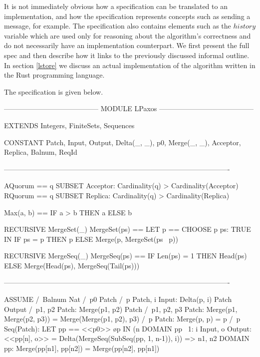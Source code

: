 \documentclass[12pt,a4paper,en]{pracamgr}
\begin{document}
It is not immediately obvious how a specification can be translated to an implementation, and how the specification represents concepts such as sending a message, for example. The specification also contains elements such as the $history$ variable which are used only for reasoning about the algorithm's correctness and do not necessarily have an implementation counterpart. We first present the full spec and then describe how it links to the previously discussed informal outline. In section \ref{lstore} we discuss an actual implementation of the algorithm written in the Rust programming language.

The specification is given below.

\begin{tla}
----------------------------------------- MODULE LPaxos -----------------------------------------

EXTENDS Integers, FiniteSets, Sequences

CONSTANT
    Patch, Input, Output, Delta(_, _), p0, Merge(_, _),
    Acceptor, Replica,
    Balnum,
    ReqId

-------------------------------------------------------------------------------------------------

AQuorum == {q \in SUBSET Acceptor:
                Cardinality(q) > Cardinality(Acceptor) }
RQuorum == {q \in SUBSET Replica:
                Cardinality(q) > Cardinality(Replica) }

Max(a, b) == IF a > b THEN a ELSE b

RECURSIVE MergeSet(_)
MergeSet(ps) ==
    LET p == CHOOSE p \in ps: TRUE
     IN IF ps = {p} THEN p
            ELSE Merge(p, MergeSet(ps \ {p}))

RECURSIVE MergeSeq(_)
MergeSeq(ps) == IF Len(ps) = 1 THEN Head(ps)
                               ELSE Merge(Head(ps), MergeSeq(Tail(ps)))

-------------------------------------------------------------------------------------------------

ASSUME
    /\ Balnum \subseteq Nat
    /\ p0 \in Patch
    /\ \A p \in Patch, i \in Input: Delta(p, i) \in Patch \X Output
    /\ \A p1, p2 \in Patch: Merge(p1, p2) \in Patch
    /\ \A p1, p2, p3 \in Patch:
            Merge(p1, Merge(p2, p3)) = Merge(Merge(p1, p2), p3)
    /\ \A p \in Patch: Merge(p, p) = p
    /\ \A p \in Seq(Patch):
             LET pp == <<p0>> \o p
              IN (\A n \in DOMAIN pp \ {1}:
                     \E i \in Input, o \in Output:
                         <<pp[n], o>> = Delta(MergeSeq(SubSeq(pp, 1, n-1)), i))
                  => \A n1, n2 \in DOMAIN pp:
                         Merge(pp[n1], pp[n2]) = Merge(pp[n2], pp[n1])


\end{tla}
\end{document}

